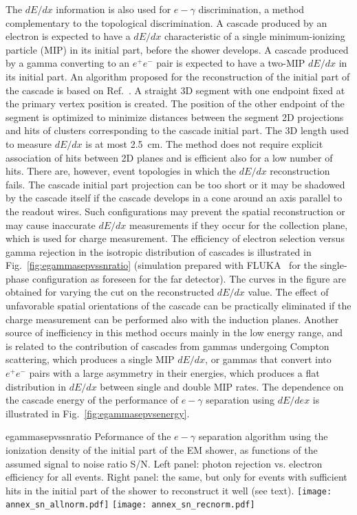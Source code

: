 The $dE/dx$ information is also used for $e-\gamma$
discrimination, a method complementary to the topological
discrimination.  A cascade produced by an electron is
expected to have a $dE/dx$ characteristic of a single minimum-ionizing particle (MIP)
in its initial part, before the shower develops. A cascade produced by a gamma
converting to an $e^+e^-$ pair is expected to have a two-MIP $dE/dx$ in its initial part. 
An algorithm proposed for the reconstruction of the initial part of the cascade is
based on Ref.~\cite{Antonello:2012hu}. A straight 3D segment with one
endpoint fixed at the primary vertex position is created.  The position
of the other endpoint of the segment is optimized to minimize distances
between the segment 2D projections and hits of clusters corresponding
to the cascade initial part. The 3D length used to measure $dE/dx$ is at
most 2.5~cm. The method does not require explicit association of hits
between 2D planes and is efficient also for a low number of
hits.  There are, however, event topologies in which the $dE/dx$
reconstruction fails. The cascade initial part projection can be too
short or it may be shadowed by the cascade itself if the cascade develops
in a cone around an axis parallel to the readout wires. Such configurations may
prevent the spatial reconstruction or may cause inaccurate $dE/dx$
measurements if they occur for the collection plane, which is used for charge
measurement. The efficiency of electron selection versus gamma
rejection in the isotropic distribution of cascades is illustrated in
Fig.~\ref{fig:egammasepvssnratio} (simulation prepared with FLUKA~\cite{FLUKA1,FLUKA2} for
the single-phase configuration as foreseen for the far detector). The curves in the
figure are obtained for varying the cut on the reconstructed $dE/dx$
value. The effect of unfavorable spatial orientations of the cascade can be
practically eliminated if the charge measurement can be performed also
with the induction planes. Another source of inefficiency in this method
occurs mainly in the low energy range, and is related to the
contribution of cascades from gammas undergoing Compton scattering, which 
produces a single MIP $dE/dx$, or gammas that convert into $e^+e^-$ pairs
with a large asymmetry in their energies, which produces a 
flat distribution in $dE/dx$ between single and double MIP rates. 
The dependence on the cascade energy of the performance of $e-\gamma$ separation using $dE/dex$
is illustrated in Fig.~\ref{fig:egammasepvsenergy}.

\begin{cdrfigure}{egammasepvssnratio}
{Peformance of the $e-\gamma$ separation algorithm using the ionization density of the
initial part of the EM shower, as functions of the assumed signal to noise ratio S/N.  Left
panel:  photon rejection vs. electron efficiency for all events.  Right panel:  the same,
but only for events with sufficient hits in the initial part of the shower to reconstruct
it well (see text).}
\texttt{[image: annex\_sn\_allnorm.pdf]}
\texttt{[image: annex\_sn\_recnorm.pdf]}
\end{cdrfigure}

